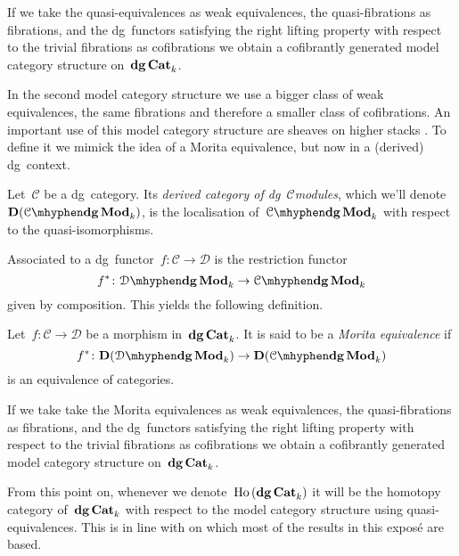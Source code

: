 \begin{refsection}
\begin{theorem}
  \label{theorem:quasi-equivalences-model-category-structure}
  If we take the quasi-equivalences as weak equivalences, the quasi-fibrations as fibrations, and the dg~functors satisfying the right lifting property with respect to the trivial fibrations as cofibrations we obtain a cofibrantly generated model category structure on~$\mathbf{dg\,Cat}_k$.
\end{theorem}

In the second model category structure we use a bigger class of weak equivalences, the same fibrations and therefore a smaller class of cofibrations. An important use of this model category structure are sheaves on higher stacks \cite{chern}. To define it we mimick the idea of a Morita equivalence, but now in a (derived) dg~context.
\begin{definition}
  Let~$\mathcal{C}$ be a dg~category. Its \emph{derived category of dg~$\mathcal{C}$\dash modules}, which we'll denote~$\mathbf{D}(\dgMod{\mathcal{C}}_k)$, is the localisation of~$\dgMod{\mathcal{C}}_k$ with respect to the quasi-isomorphisms.
\end{definition}
Associated to a dg~functor~$f\colon\mathcal{C}\to\mathcal{D}$ is the restriction functor
\begin{equation}
  f^*\colon\dgMod{\mathcal{D}}_k\to\dgMod{\mathcal{C}}_k
\end{equation}
given by composition. This yields the following definition.
\begin{definition}
  Let~$f\colon\mathcal{C}\to\mathcal{D}$ be a morphism in~$\mathbf{dg\,Cat}_k$. It is said to be a \emph{Morita equivalence} if
  \begin{equation}
    f^*\colon\mathbf{D}(\dgMod{\mathcal{D}}_k)\to\mathbf{D}(\dgMod{\mathcal{C}}_k)
  \end{equation}
  is an equivalence of categories.
\end{definition}

\begin{theorem}
  \label{theorem:morita-morphisms-model-category-structure}
  If we take take the Morita equivalences as weak equivalences, the quasi-fibrations as fibrations, and the dg~functors satisfying the right lifting property with respect to the trivial fibrations as cofibrations we obtain a cofibrantly generated model category structure on~$\mathbf{dg\,Cat}_k$.
\end{theorem}

\begin{remark}
  From this point on, whenever we denote~$\operatorname{\mathrm{Ho} \,}(\mathbf{dg\,Cat}_k)$ it will be the homotopy category of~$\mathbf{dg\,Cat}_k$ with respect to the model category structure using quasi-equivalences. This is in line with \cite{toen} on which most of the results in this expos\'e are based.
\end{remark}



\end{refsection}
